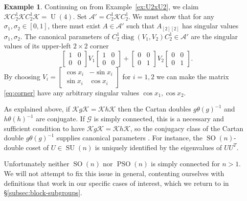 \documentclass[reqno]{amsart}
\theoremstyle{definition} \newtheorem{example}[theorem]{Example}
\newcommand{\U}{\operatorname{U}}
\newcommand{\SU}{\operatorname{SU}}
\newcommand{\SO}{\operatorname{SO}}
\newcommand{\PSO}{\operatorname{PSO}}
\newcommand{\diag}{\operatorname{diag}}
\newcommand{\secsymbol}{§}
\newcommand{\G}{\mathcal{G}}
\newcommand{\K}{\mathcal{K}}
\newcommand{\A}{\mathcal{A}}
\begin{document}
\begin{example}
Continuing on from Example~\ref{ex:U2xU2}, we claim $\K C_2^1 \K C_2^1 \K = \U(4)$. Set $\A' = C_2^1 \K C_2^1$. We must show that for any $\sigma_1,\sigma_2 \in [0,1]$, there must exist $A \in \A'$ such that $A_{[2][2]}$ has singular values $\sigma_1, \sigma_2$.     The canonical parameters of $C_2^1 \diag(V_1,V_2) C_2^1 \in \A'$ are the singular values of its upper-left $2 \times 2$ corner
\begin{equation} \label{eq:corner}
\begin{bmatrix} 1 & 0 \\ 0 & 0 \end{bmatrix} V_1 \begin{bmatrix} 1 & 0 \\ 0 & 0 \end{bmatrix} + \begin{bmatrix} 0 & 0 \\ 0 & 1 \end{bmatrix} V_2 \begin{bmatrix} 0 & 0 \\ 0 & 1 \end{bmatrix}.
\end{equation}
By choosing $V_i = \left[ \begin{smallmatrix} \cos x_i & -\sin x_i \\ \sin x_i & \cos x_i \end{smallmatrix} \right]$ for $i = 1,2$ we can make the matrix \eqref{eq:corner} have any arbitrary singular values $\cos x_1, \cos x_2$.
\end{example}

As explained above, if $\K g \K = \K h \K$ then the Cartan doubles $g\theta(g)^{-1}$ and $h\theta(h)^{-1}$ are conjugate. If $\G$ is simply connected, this is a necessary and sufficient condition to have $\K g \K = \K h \K$, so the conjugacy class of the Cartan double $g\theta(g)^{-1}$ supplies canonical parameters \cite[Ch.\ VII, Theorem 8.6]{helgason}. For instance, the $\SO(n)$-double coset of $U \in \SU(n)$ is uniquely identified by the eigenvalues of $UU^T$.

Unfortunately neither $\SO(n)$ nor $\PSO(n)$ is simply connected for $n > 1$. We will not attempt to fix this issue in general, contenting ourselves with definitions that work in our specific cases of interest, which we return to in \secsymbol\ref{subsec:block-subgroups}.
\end{document}

